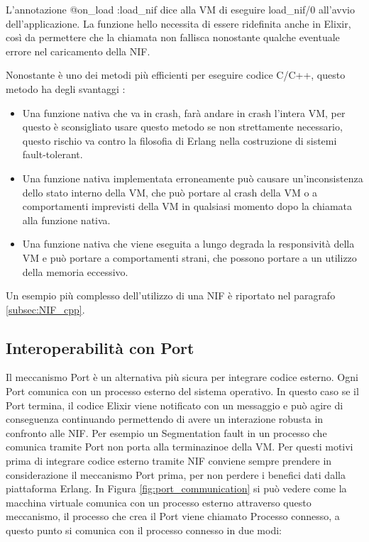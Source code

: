 L'annotazione @on\_load :load\_nif dice alla VM di eseguire load\_nif/0
all'avvio dell'applicazione.
La funzione hello necessita di essere ridefinita anche in Elixir,
così da permettere che la chiamata non fallisca nonostante qualche
eventuale errore nel caricamento della NIF.

Nonostante è uno dei metodi più efficienti per eseguire codice C/C++,
questo metodo ha degli svantaggi \cite{Erlanger73:online}:

\begin{itemize}
	\item Una funzione nativa che va in crash, farà andare in crash l'intera
	VM, per questo è sconsigliato usare questo metodo se non strettamente necessario,
	questo rischio va contro la filosofia di Erlang nella costruzione di sistemi
	fault-tolerant.
	\item Una funzione nativa implementata erroneamente può causare
	un'inconsistenza dello stato interno della VM, che può portare 
	al crash della VM o a comportamenti imprevisti della VM in 
	qualsiasi momento dopo la chiamata alla funzione nativa.
	\item Una funzione nativa che viene eseguita a lungo degrada la
	responsività della VM e può portare a comportamenti strani, che possono
	portare a un utilizzo della memoria eccessivo.
\end{itemize}

Un esempio più complesso dell'utilizzo di una NIF è riportato
nel paragrafo \ref{subsec:NIF_cpp}.

\subsection{Interoperabilità con Port}

Il meccanismo Port è un alternativa più sicura per
integrare codice esterno. Ogni Port comunica con un
processo esterno del sistema operativo.
In questo caso se il Port termina, il codice Elixir
viene notificato con un messaggio e può agire di conseguenza
continuando permettendo di avere un interazione robusta
in confronto alle NIF. Per esempio un Segmentation fault
in un processo che comunica tramite Port non porta alla
terminazinoe della VM. Per questi motivi prima di integrare
codice esterno tramite NIF conviene sempre prendere in considerazione
il meccanismo Port prima, per non perdere i benefici dati dalla
piattaforma Erlang. In Figura \ref{fig:port_communication}
si può vedere come la macchina virtuale comunica con un
processo esterno attraverso questo meccanismo, il processo che
crea il Port viene chiamato Processo connesso, a questo punto
si comunica con il processo connesso in due modi:

